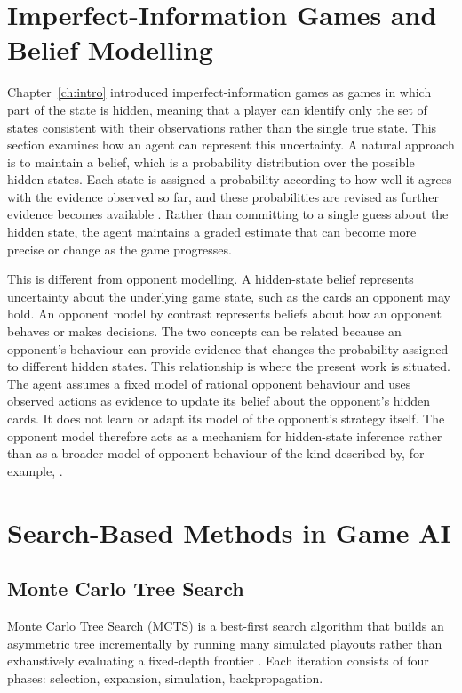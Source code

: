 \documentclass[12pt,a4paper,oneside]{report}
\begin{document}
\section{Imperfect-Information Games and Belief Modelling}

Chapter~\ref{ch:intro} introduced imperfect-information games as games in which part of the state is hidden, meaning that a player can identify only the set of states consistent with their observations rather than the single true state. This section examines how an agent can represent this uncertainty. A natural approach is to maintain a belief, which is a probability distribution over the possible hidden states. Each state is assigned a probability according to how well it agrees with the evidence observed so far, and these probabilities are revised as further evidence becomes available \parencite{frank1998search}. Rather than committing to a single guess about the hidden state, the agent maintains a graded estimate that can become more precise or change as the game progresses.

This is different from opponent modelling. A hidden-state belief represents uncertainty about the underlying game state, such as the cards an opponent may hold. An opponent model by contrast represents beliefs about how an opponent behaves or makes decisions. The two concepts can be related because an opponent's behaviour can provide evidence that changes the probability assigned to different hidden states. This relationship is where the present work is situated. The agent assumes a fixed model of rational opponent behaviour and uses observed actions as evidence to update its belief about the opponent's hidden cards. It does not learn or adapt its model of the opponent's strategy itself. The opponent model therefore acts as a mechanism for hidden-state inference rather than as a broader model of opponent behaviour of the kind described by, for example, \textcite{southey2005bayes}.

\section{Search-Based Methods in Game AI}

\subsection{Monte Carlo Tree Search}

Monte Carlo Tree Search (MCTS) is a best-first search algorithm that builds an
asymmetric tree incrementally by running many simulated playouts rather than
exhaustively evaluating a fixed-depth frontier \parencite{coulom2006efficient}. Each
iteration consists of four phases: selection, expansion, simulation, backpropagation.
\end{document}
